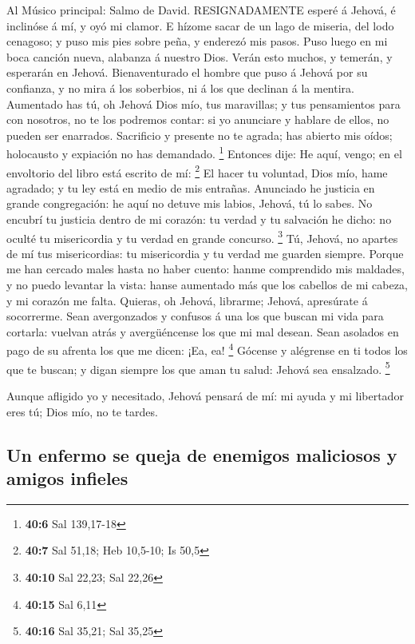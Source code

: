  Al Músico principal: Salmo de David. RESIGNADAMENTE esperé
á Jehová, é inclinóse á mí, y oyó mi clamor.  E hízome sacar
de un lago de miseria, del lodo cenagoso; y puso mis pies sobre peña, y
enderezó mis pasos.  Puso luego en mi boca canción nueva,
alabanza á nuestro Dios. Verán esto muchos, y temerán, y esperarán en
Jehová.  Bienaventurado el hombre que puso á Jehová por su
confianza, y no mira á los soberbios, ni á los que declinan á la
mentira.  Aumentado has tú, oh Jehová Dios mío, tus
maravillas; y tus pensamientos para con nosotros, no te los podremos
contar: si yo anunciare y hablare de ellos, no pueden ser enarrados.
 Sacrificio y presente no te agrada; has abierto mis oídos;
holocausto y expiación no has demandado. \footnote{\textbf{40:6} Sal
  139,17-18}  Entonces dije: He aquí, vengo; en el
envoltorio del libro está escrito de mí: \footnote{\textbf{40:7} Sal
  51,18; Heb 10,5-10; Is 50,5}  El hacer tu voluntad, Dios
mío, hame agradado; y tu ley está en medio de mis entrañas. 
Anunciado he justicia en grande congregación: he aquí no detuve mis
labios, Jehová, tú lo sabes.  No encubrí tu justicia dentro
de mi corazón: tu verdad y tu salvación he dicho: no oculté tu
misericordia y tu verdad en grande concurso. \footnote{\textbf{40:10}
  Sal 22,23; Sal 22,26}  Tú, Jehová, no apartes de mí tus
misericordias: tu misericordia y tu verdad me guarden siempre.
 Porque me han cercado males hasta no haber cuento: hanme
comprendido mis maldades, y no puedo levantar la vista: hanse aumentado
más que los cabellos de mi cabeza, y mi corazón me falta. 
Quieras, oh Jehová, librarme; Jehová, apresúrate á socorrerme.
 Sean avergonzados y confusos á una los que buscan mi vida
para cortarla: vuelvan atrás y avergüéncense los que mi mal desean.
 Sean asolados en pago de su afrenta los que me dicen: ¡Ea,
ea! \footnote{\textbf{40:15} Sal 6,11}  Gócense y alégrense
en ti todos los que te buscan; y digan siempre los que aman tu salud:
Jehová sea ensalzado. \footnote{\textbf{40:16} Sal 35,21; Sal 35,25}

 Aunque afligido yo y necesitado, Jehová pensará de mí: mi
ayuda y mi libertador eres tú; Dios mío, no te tardes.

\hypertarget{un-enfermo-se-queja-de-enemigos-maliciosos-y-amigos-infieles}{%
\subsection{Un enfermo se queja de enemigos maliciosos y amigos
infieles}\label{un-enfermo-se-queja-de-enemigos-maliciosos-y-amigos-infieles}}

